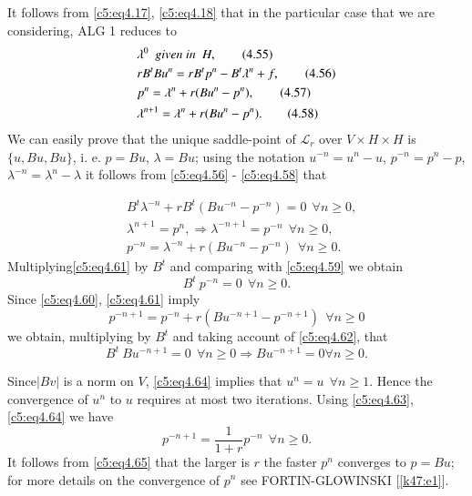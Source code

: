 \begin{proof of proposition}\label{c5:prfofprop4.1}%
 It follows from \eqref{c5:eq4.17},  \eqref{c5:eq4.18} that in the particular case that we are considering,  ALG 1 reduces to 
\begin{align}
&\lambda^0~~\text{\em given in}~~H, \tag{4.55}\label{c5:eq4.55}\\
&r B^t Bu^n = r B^t p^n - B^t \lambda^n  + f, \tag{4.56}\label{c5:eq4.56}\\
&p^n = \lambda^n + r (Bu^n - p^n), \tag{4.57}\label{c5:eq4.57}\\
&\lambda^{n+1}= \lambda^n + r (Bu^n - p^n). \tag{4.58}\label{c5:eq4.58}
\end{align}
We can easily prove that the unique saddle-point of  $\mathscr{L}_r$ over $V \times H \times H$ is $\{u, Bu, Bu\}$,  i. e.  $p = B u$,  $\lambda = B u$; using the notation $u^{-n}= u^n - u$,  $p^{-n}= p^n - p$,  $\lambda^{-n} = \lambda^n - \lambda$  it follows from \eqref{c5:eq4.56} - \eqref{c5:eq4.58} that 
\end{proof of proposition}
\begin{align}
&B^t \lambda^{-n} + r B ^t (Bu^{-n}-p^{-n}) =0 ~~\forall n \geq 0,  \tag{4.59}\label{c5:eq4.59}\\
&\lambda^{n+1}= p^n,  \Rightarrow \lambda^{-n+1} = p^{-n} ~~\forall n \geq 0,  \tag{4.60}\label{c5:eq4.60}\\
&p^{-n}= \lambda^{-n} + r (Bu^{-n} - p^{-n})~~ \forall n \geq 0. \tag{4.61}\label{c5:eq4.61}
\end{align}
Multiplying\pageoriginale  \eqref{c5:eq4.61} by $B^t$ and comparing with \eqref{c5:eq4.59} we obtain 
\begin{equation}
B^t~ p^{-n}= 0~~ \forall n \geq 0. \tag{4.62}\label{c5:eq4.62}
\end{equation}
Since \eqref{c5:eq4.60},  \eqref{c5:eq4.61} imply 
\begin{equation}
p^{-n+1} = p^{-n} + r (Bu^{- n + 1}-p^{-n+1}) ~~\forall n \geq 0
\tag{4.63}\label{c5:eq4.63} 
\end{equation}
we obtain,  multiplying by $B^t$ and taking account of \eqref{c5:eq4.62}, that 
\begin{equation}
B^t~ Bu^{-n+1} = 0 ~~\forall n \geq 0 \Rightarrow Bu^{- n + 1} = 0
\forall n \geq 0. \tag{4.64}\label{c5:eq4.64} 
\end{equation}

Since$| Bv|$ is a norm on $V$,  \eqref{c5:eq4.64} implies that $u^n =u
~~\forall n \geq 1$.  Hence the convergence of $u^n$ to $u$ requires
at most two iterations.  Using \eqref{c5:eq4.63},  \eqref{c5:eq4.64}
we have  
\begin{equation}
p^{- n + 1} = \frac{1}{1 + r} p^{-n} ~~\forall n \geq 0.
\tag{4.65}\label{c5:eq4.65} 
\end{equation}
It follows from \eqref{c5:eq4.65} that the larger is $r$ the faster
$p^n$ converges to $p = Bu $; for more details on the convergence of
$p^n$ see FORTIN-\break GLOWINSKI [\ref{k47:e1}].  

